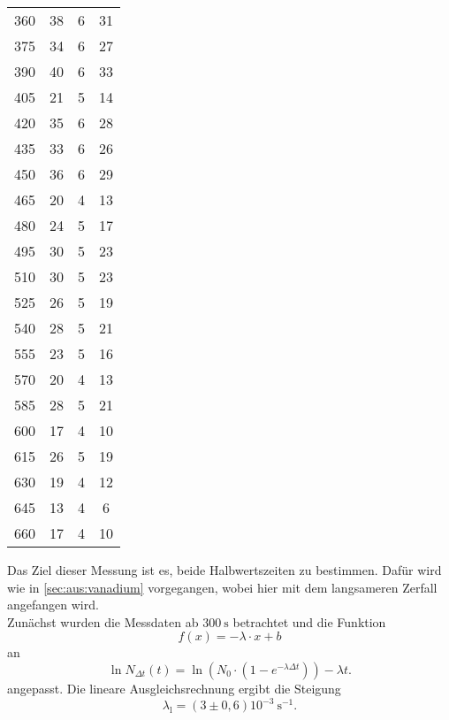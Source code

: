 \begin{longtable}{c c c c}
		360  	&  38  	&  6         	&  31 \\
		375  	&  34  	&  6         	&  27 \\
		390  	&  40  	&  6         	&  33 \\
		405  	&  21  	&  5         	&  14 \\
		420  	&  35  	&  6         	&  28 \\
		435  	&  33  	&  6         	&  26 \\
		450  	&  36  	&  6         	&  29 \\
		465  	&  20  	&  4         	&  13 \\
		480  	&  24  	&  5         	&  17 \\
		495  	&  30  	&  5         	&  23 \\
		510  	&  30  	&  5         	&  23 \\
		525  	&  26  	&  5         	&  19 \\
		540  	&  28  	&  5         	&  21 \\
		555  	&  23  	&  5         	&  16 \\
		570  	&  20  	&  4         	&  13 \\
		585  	&  28  	&  5         	&  21 \\
		600  	&  17  	&  4         	&  10 \\
		615  	&  26  	&  5         	&  19 \\
		630  	&  19  	&  4         	&  12 \\
		645  	&  13  	&  4         	&   6 \\
		660  	&  17  	&  4         	&  10 \\
\end{longtable}
\noindent
Das Ziel dieser Messung ist es, beide Halbwertszeiten zu bestimmen. Dafür wird wie in \autoref{sec:aus:vanadium}
vorgegangen, wobei hier mit dem langsameren Zerfall angefangen wird.
\\
Zunächst wurden die Messdaten ab $\SI{300}{\second}$ betrachtet und die Funktion
\begin{equation}
	f(x) = -\lambda \cdot x + b
	\label{eqn:mx+b2}
\end{equation}
\noindent
an 
\begin{equation}
	\ln N_{\Delta t}(t) = \ln(N_0 \cdot (1 - e^{-\lambda \Delta t})) - \lambda t.
	\label{eqn:logarithmisch2}
\end{equation}
angepasst.
Die lineare Ausgleichsrechnung ergibt die Steigung
\begin{equation}
	\lambda_\text{l} = (3 \pm 0,6) 10^{-3}\ \si{\second}^{-1}.
\end{equation}
